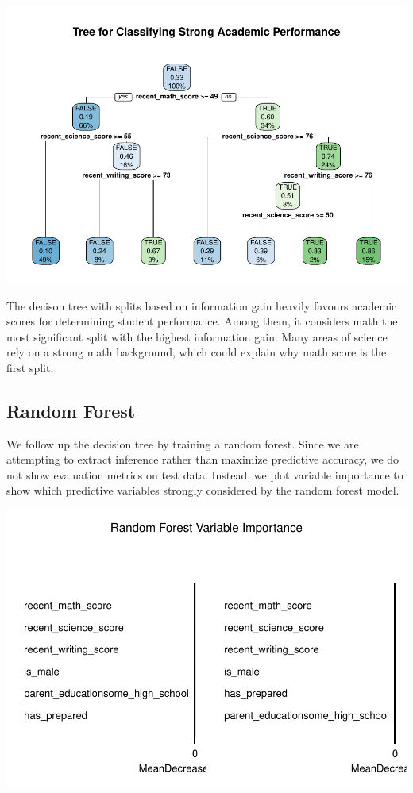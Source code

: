 \documentclass[
]{article}
\begin{document}
\includegraphics{ST494_FP_files/figure-latex/unnamed-chunk-38-1.pdf}

The decison tree with splits based on information gain heavily favours
academic scores for determining student performance. Among them, it
considers math the most significant split with the highest information
gain. Many areas of science rely on a strong math background, which
could explain why math score is the first split.

\subsection{Random Forest}\label{random-forest}

We follow up the decision tree by training a random forest. Since we are
attempting to extract inference rather than maximize predictive
accuracy, we do not show evaluation metrics on test data. Instead, we
plot variable importance to show which predictive variables strongly
considered by the random forest model.

\includegraphics{ST494_FP_files/figure-latex/unnamed-chunk-40-1.pdf}
\end{document}

